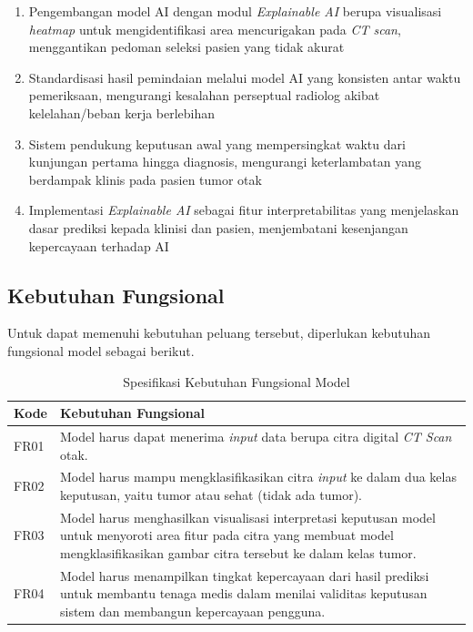 \begin{enumerate}
	\item Pengembangan model AI dengan modul \textit{Explainable AI} berupa visualisasi \textit{heatmap} untuk mengidentifikasi area mencurigakan pada \textit{CT scan}, menggantikan pedoman seleksi pasien yang tidak akurat
	\item Standardisasi hasil pemindaian melalui model AI yang konsisten antar waktu pemeriksaan, mengurangi kesalahan perseptual radiolog akibat kelelahan/beban kerja berlebihan
	\item Sistem pendukung keputusan awal yang mempersingkat waktu dari kunjungan pertama hingga diagnosis, mengurangi keterlambatan yang berdampak klinis pada pasien tumor otak
	\item Implementasi \textit{Explainable AI} sebagai fitur interpretabilitas yang menjelaskan dasar prediksi kepada klinisi dan pasien, menjembatani kesenjangan kepercayaan terhadap AI
\end{enumerate}

\subsection{Kebutuhan Fungsional}
Untuk dapat memenuhi kebutuhan peluang tersebut, diperlukan kebutuhan fungsional model sebagai berikut.

\begin{table}[h]
	\centering
	\caption{Spesifikasi Kebutuhan Fungsional Model}
	\label{tab:kebutuhan_fungsional}
	\begin{tabular}{|l|p{11cm}|}
		\hline
		\textbf{Kode} & \textbf{Kebutuhan Fungsional} \\ \hline
		FR01 & Model harus dapat menerima \textit{input} data berupa citra digital \textit{CT Scan} otak. \\ \hline
		FR02 & Model harus mampu mengklasifikasikan citra \textit{input} ke dalam dua kelas keputusan, yaitu tumor atau sehat (tidak ada tumor). \\ \hline
		FR03 & Model harus menghasilkan visualisasi interpretasi keputusan model untuk menyoroti area fitur pada citra yang membuat model mengklasifikasikan gambar citra tersebut ke dalam kelas tumor. \\ \hline
		FR04 & Model harus menampilkan tingkat kepercayaan dari hasil prediksi untuk membantu tenaga medis dalam menilai validitas keputusan sistem dan membangun kepercayaan pengguna. \\ \hline
	\end{tabular}
\end{table}

